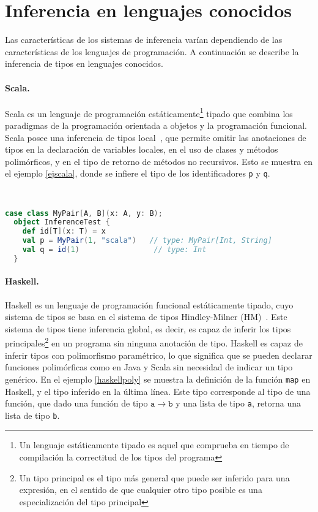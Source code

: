 \section{Inferencia en lenguajes conocidos}
Las características de los sistemas de inferencia varían dependiendo de las características de los lenguajes de programación. A continuación se describe la inferencia de tipos en lenguajes conocidos.

\paragraph{Scala.} Scala es un lenguaje de programación estáticamente\footnote{Un lenguaje estáticamente tipado es aquel que comprueba en tiempo de compilación la correctitud de los tipos del programa} tipado que combina los paradigmas de la programación orientada a objetos y la programación funcional. Scala posee una inferencia de tipos local~\cite{pierce}, que permite omitir las anotaciones de tipos en la declaración de variables locales, en el uso de clases y métodos polimórficos, y en el tipo de retorno de métodos no recursivos. Esto se muestra en el ejemplo \ref{ejscala}, donde se infiere el tipo de los identificadores \texttt{p} y \texttt{q}.
\clearpage
\begin{ej} \ \\
  \normalfont
  \label{ejscala}
\begin{lstlisting}[language=Scala]
  case class MyPair[A, B](x: A, y: B);
  object InferenceTest {
    def id[T](x: T) = x
    val p = MyPair(1, "scala")   // type: MyPair[Int, String]
    val q = id(1)                 // type: Int
  }
\end{lstlisting}
\end{ej}

\paragraph{Haskell.} Haskell es un lenguaje de programación funcional estáticamente tipado, cuyo sistema de tipos se basa en el sistema de tipos Hindley-Milner (HM)~\cite{damasmilner}. Este sistema de tipos tiene inferencia global, es decir, es capaz de inferir los tipos principales\footnote{Un tipo principal es el tipo más general que puede ser inferido para una expresión, en el sentido de que cualquier otro tipo posible es una especialización del tipo principal} en un programa sin ninguna anotación de tipo. Haskell es capaz de inferir tipos con polimorfismo paramétrico, lo que significa que se pueden declarar funciones polimórficas como en Java y Scala sin necesidad de indicar un tipo genérico. En el ejemplo \ref{haskellpoly} se muestra la definición de la función \texttt{map} en Haskell, y el tipo inferido en la última línea. Este tipo corresponde al tipo de una función, que dado una función de tipo $\mathtt{a \rightarrow b}$ y una lista de tipo \texttt{a}, retorna una lista de tipo \texttt{b}.


